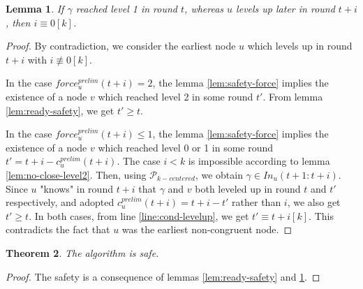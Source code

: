 \documentclass[11pt,letterpaper]{article}
\newtheorem{thm}{Theorem}
\newtheorem{lem}[thm]{Lemma}
\newcommand{\cent}{\gamma}
\begin{document}
\begin{lem} \label{lem:later-level1}
	If $\cent$ reached level 1 in round $t$, whereas $u$ levels up later in round $t+i$, then $i \equiv 0 [k]$. 
\end{lem}
\begin{proof}
	By contradiction, we consider the earliest node $u$ which levels up in round $t+i$ with $i \not\equiv 0 [k]$.

	In the case $force_u^{prelim}(t+i) = 2$, the lemma \ref{lem:safety-force} implies the existence of a node $v$ which reached level 2 in some round $t'$. 
	From lemma \ref{lem:ready-safety}, we get $t' \geq t$.

	In the case $force_u^{prelim}(t+i) \leq 1$, the lemma \ref{lem:safety-force} implies the existence of a node $v$ which reached level 0 or 1 in some round $t' = t+i-c_u^{prelim}(t+i)$. 
	The case $i < k$ is impossible according to lemma \ref{lem:no-close-level2}.
	Then, using $\mathcal{P}_{k-centered}$, we obtain $\cent \in In_u(t+1:t+i)$.
	Since $u$ "knows" in round $t+i$ that $\cent$ and $v$ both leveled up in round $t$ and $t'$ respectively, and adopted $c_u^{prelim}(t+i) = t+i-t'$ rather than $i$,
	we also get $t' \geq t$.
	In both cases, from line \ref{line:cond-levelup}, we get $t' \equiv t+i [k]$.
	This contradicts the fact that $u$ was the earliest non-congruent node.
\end{proof}

\begin{thm} \label{lem:safety} 
	The algorithm is safe.
\end{thm}
\begin{proof}
	The safety is a consequence of lemmas \ref{lem:ready-safety} and \ref{lem:later-level1}.
\end{proof}
\end{document}
